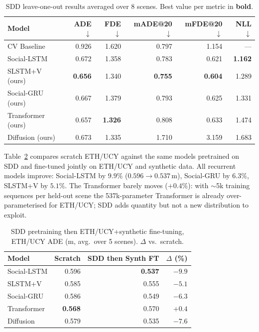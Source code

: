 \documentclass[conference]{IEEEtran}
\begin{document}
\begin{table}[t]
\caption{SDD leave-one-out results averaged over 8 scenes.
         Best value per metric in \textbf{bold}.}
\label{tab:sdd}
\centering
\footnotesize
\setlength{\tabcolsep}{4pt}
\begin{tabular}{@{}lrrrrr@{}}
\toprule
Model
  & ADE$\downarrow$
  & FDE$\downarrow$
  & mADE@20$\downarrow$
  & mFDE@20$\downarrow$
  & NLL$\downarrow$ \\
\midrule
CV Baseline
  & 0.926 & 1.620 & 0.797 & 1.154 & --- \\
Social-LSTM
  & 0.672 & 1.358 & 0.783 & 0.621 & \textbf{1.162} \\
SLSTM+V (ours)
  & \textbf{0.656} & 1.340 & \textbf{0.755} & \textbf{0.604} & 1.289 \\
Social-GRU (ours)
  & 0.667 & 1.379 & 0.793 & 0.625 & 1.331 \\
Transformer (ours)
  & 0.657 & \textbf{1.326} & 0.808 & 0.633 & 1.474 \\
Diffusion (ours)
  & 0.673 & 1.335 & 1.710 & 3.159 & 1.683 \\
\bottomrule
\end{tabular}
\end{table}

Table~\ref{tab:finetune} compares scratch ETH/UCY against the same
models pretrained on SDD and fine-tuned jointly on ETH/UCY and
synthetic data.  All recurrent models improve: Social-LSTM by $9.9\%$
($0.596 \to 0.537$\,m), Social-GRU by $6.3\%$, SLSTM+V by $5.1\%$.  The
Transformer barely moves ($+0.4\%$): with $\sim$5k training sequences
per held-out scene the 537k-parameter Transformer is already
over-parameterised for ETH/UCY; SDD adds quantity but not a new
distribution to exploit.

\begin{table}[t]
\caption{SDD pretraining then ETH/UCY+synthetic fine-tuning, ETH/UCY
         ADE (m, avg.\ over 5 scenes).  $\Delta$ vs.\ scratch.}
\label{tab:finetune}
\centering
\footnotesize
\setlength{\tabcolsep}{4pt}
\begin{tabular}{@{}lrrr@{}}
\toprule
Model & Scratch & SDD then Synth FT & $\Delta$ (\%) \\
\midrule
Social-LSTM  & 0.596 & \textbf{0.537} & $-9.9$ \\
SLSTM+V      & 0.585 & 0.555          & $-5.1$ \\
Social-GRU       & 0.586 & 0.549          & $-6.3$ \\
Transformer  & \textbf{0.568} & 0.570 & $+0.4$ \\
Diffusion    & 0.579 & 0.535          & $-7.6$ \\
\bottomrule
\end{tabular}
\end{table}
\end{document}
